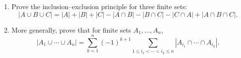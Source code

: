 \begin{enumerate}
\item[(a)] Prove the inclusion--exclusion principle for three finite sets:
\[
|A\cup B\cup C|=|A|+|B|+|C|-|A\cap B|-|B\cap C|-|C\cap A|+|A\cap B\cap C| .
\]
\item[(b)] More generally, prove that for finite sets $A_1,\dots,A_n$,
\[
|A_1\cup\cdots\cup A_n|=\sum_{k=1}^{n}(-1)^{k+1}\sum_{1\le i_1<\cdots<i_k\le n}|A_{i_1}\cap\cdots\cap A_{i_k}| .
\]
\end{enumerate}
